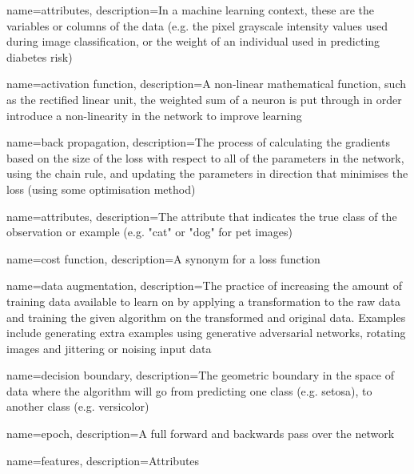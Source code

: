 
{
    name=attributes,
    description={In a machine learning context, these are the variables or columns of the data (e.g. the pixel grayscale intensity values used during image classification, or the weight of an individual used in predicting diabetes risk)}
}

{
    name=activation function,
    description={A non-linear mathematical function, such as the rectified linear unit, the weighted sum of a neuron is put through in order introduce a non-linearity in the network to improve learning}
}

{
    name=back propagation,
    description={The process of calculating the gradients based on the size of the loss with respect to all of the parameters in the network, using the chain rule, and updating the parameters in direction that minimises the loss (using some optimisation method)}
}

{
    name=attributes,
    description={The attribute that indicates the true class of the observation or example (e.g. "cat" or "dog" for pet images)}
}

{
    name={cost function},
    description={A synonym for a loss function \cite[p.~80]{good_fellow_2016}}
}

{
    name=data augmentation,
    description={The practice of increasing the amount of training data available to learn on by applying a transformation to the raw data and training the given algorithm on the transformed and original data. Examples include generating extra examples using generative adversarial networks, rotating images and jittering or noising input data}
}

{
    name=decision boundary,
    description={The geometric boundary in the space of data where the algorithm will go from predicting one class (e.g. setosa), to another class (e.g. versicolor)}
}

{
    name=epoch,
    description={A full forward and backwards pass over the network}
}

{
    name=features,
    description={Attributes}
}

